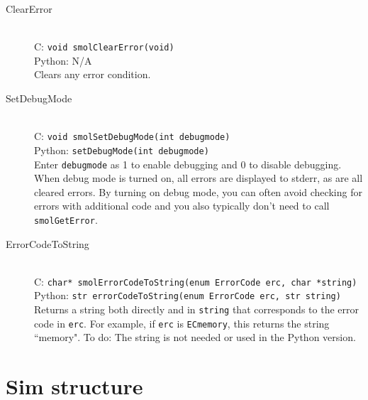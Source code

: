\documentclass {book}
\newcommand {\ttt} {\texttt}
\begin{document}
\begin{description}
\item[ClearError]
\hfill \\
C: \ttt{void smolClearError(void)}\\
Python: N/A\\
Clears any error condition.

\item[SetDebugMode]
\hfill \\
C: \ttt{void smolSetDebugMode(int debugmode)}\\
Python: \ttt{setDebugMode(int debugmode)}\\
Enter \ttt{debugmode} as 1 to enable debugging and 0 to disable debugging. When debug mode is turned on, all errors are displayed to stderr, as are all cleared errors. By turning on debug mode, you can often avoid checking for errors with additional code and you also typically don't need to call \ttt{smolGetError}.

\item[ErrorCodeToString]
\hfill \\
C: \ttt{char* smolErrorCodeToString(enum ErrorCode erc, char *string)}\\
Python: \ttt{str errorCodeToString(enum ErrorCode erc, str string)}\\
Returns a string both directly and in \ttt{string} that corresponds to the error code in \ttt{erc}. For example, if \ttt{erc} is \ttt{ECmemory}, this returns the string ``memory". To do: The string is not needed or used in the Python version.

\end{description}

\section{Sim structure}
\end{document}
